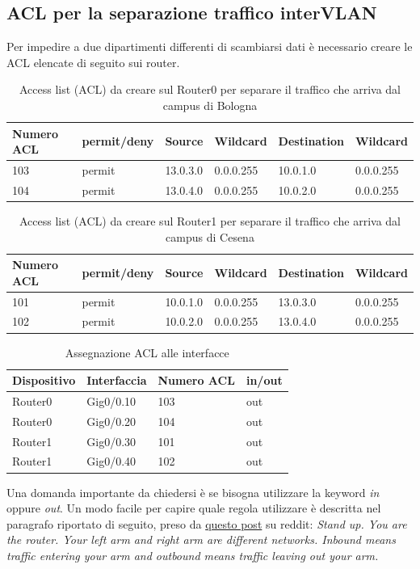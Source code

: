 \documentclass[a4paper,12pt]{report}
\begin{document}
\subsection{ACL per la separazione traffico interVLAN}
Per impedire a due dipartimenti differenti di scambiarsi dati è necessario creare le ACL elencate di seguito sui router.
\begin{table}[H]
\begin{tabular}{@{}llllll@{}}
\toprule
Numero ACL & permit/deny & Source & Wildcard & Destination & Wildcard \\ \midrule
103 & permit & 13.0.3.0 & 0.0.0.255 & 10.0.1.0 & 0.0.0.255 \\
104 & permit & 13.0.4.0 & 0.0.0.255 & 10.0.2.0 & 0.0.0.255 \\ \bottomrule
\end{tabular}
\caption{Access list (ACL) da creare sul Router0 per separare il traffico che arriva dal campus di Bologna}
\label{table:access_list_router1}
\end{table}
\begin{table}[H]
\begin{tabular}{@{}llllll@{}}
\toprule
Numero ACL & permit/deny & Source & Wildcard & Destination & Wildcard \\ \midrule
101 & permit & 10.0.1.0 & 0.0.0.255 & 13.0.3.0 & 0.0.0.255 \\
102 & permit & 10.0.2.0 & 0.0.0.255 & 13.0.4.0 & 0.0.0.255 \\ \bottomrule
\end{tabular}
\caption{Access list (ACL) da creare sul Router1 per separare il traffico che arriva dal campus di Cesena}
\label{table:access_list_router0}
\end{table}
\begin{table}[H]
\begin{tabular}{@{}llll@{}}
\toprule
Dispositivo & Interfaccia & Numero ACL & in/out \\ \midrule
Router0 & Gig0/0.10 & 103 & out \\
Router0 & Gig0/0.20 & 104 & out \\
Router1 & Gig0/0.30 & 101 & out \\
Router1 & Gig0/0.40 & 102 & out \\ \bottomrule
\end{tabular}
\caption{Assegnazione ACL alle interfacce}
\label{table:access_group}
\end{table}
Una domanda importante da chiedersi è se bisogna utilizzare la keyword \textit{in} oppure \textit{out}.
%
Un modo facile per capire quale regola utilizzare è descritta nel paragrafo riportato di seguito, preso da \href{https://www.reddit.com/r/ccna/comments/5x39ow/confused_on_the_difference_between_inout_standard/deexypo/}{questo post} su reddit: \textit{Stand up. You are the router. Your left arm and right arm are different networks. Inbound means traffic entering your arm and outbound means traffic leaving out your arm.}
\end{document}
